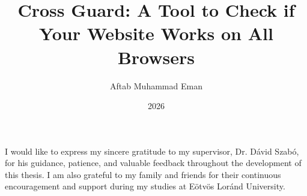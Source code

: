 \documentclass[
]{elteikthesis}[2024/04/26]
\title{Cross Guard: A Tool to Check if Your Website Works on All Browsers} %
\date{2026} %
\author{Aftab Muhammad Eman}
\affiliation{Assistant Professor} %
\begin{document}


\maketitle
%

\tableofcontents
\cleardoublepage


\cleardoublepage


\cleardoublepage


\cleardoublepage


\cleardoublepage

\chapter*{\acklabel}
I would like to express my sincere gratitude to my supervisor, Dr. Dávid Szabó, for his guidance, patience, and valuable feedback throughout the development of this thesis. I am also grateful to my family and friends for their continuous encouragement and support during my studies at Eötvös Loránd University.

{}
\printbibliography[title=\biblabel]
\cleardoublepage

{}
\listoffigures
\cleardoublepage

{}
\listoftables
\cleardoublepage

{}
\lstlistoflistings

\end{document}
